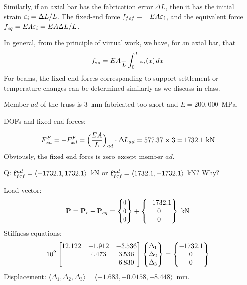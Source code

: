 Similarly, if an axial bar has the fabrication error $\Delta L$, then it has the initial strain $\varepsilon_i = \Delta L/L$. The fixed-end force $f_{fef} = -EA\varepsilon_i$, and the equivalent force $f_{eq} = EA\varepsilon_i = EA\Delta L/L$.

In general, from the principle of virtual work, we have, for an axial bar, that
\begin{equation}
  f_{eq} = EA\frac1L\int_0^L \varepsilon_i(x)\,dx
\end{equation}
For beams, the fixed-end forces corresponding to support settlement or temperature changes can be determined similarly as we discuss in class.
\begin{fig}
  
\end{fig}

\begin{example}
Member $ad$ of the truss is 3~mm fabricated too short and $E = 200{,}000$~MPa.
\begin{fig}
  
\end{fig}
DOFs and fixed end forces:
\begin{fig}
  
\end{fig}
\begin{fig}
  
\end{fig}
\begin{equation*}
  F^F_{xa} = -F^F_{xd} = \Bigl(\frac{EA}{L}\Bigr)_{ad}\cdot\Delta L_{ad} = 577.37\times3 = 1732.1\text{ kN}
\end{equation*}
Obviously, the fixed end force is zero except member $ad$.

Q: $\mathbf{f}^{ad}_{fef} = \langle -1732.1, 1732.1\rangle$~kN or $\mathbf{f}^{ad}_{fef} = \langle 1732.1, -1732.1\rangle$~kN? Why?

Load vector:
\begin{equation*}
  \mathbf{P} = \mathbf{P}_c + \mathbf{P}_{eq} = \begin{Bmatrix}0\\ 0\\ 0\end{Bmatrix} + \begin{Bmatrix}-1732.1\\ 0\\ 0\end{Bmatrix}\text{ kN}
\end{equation*}
Stiffness equations:
\begin{equation*}
  10^2\begin{bmatrix}12.122 & -1.912 & -3.536\\ & 4.473 & 3.536\\ & & 6.830\end{bmatrix}\begin{Bmatrix}\Delta_1\\ \Delta_2\\ \Delta_3\end{Bmatrix} = \begin{Bmatrix}-1732.1\\ 0\\ 0\end{Bmatrix}
\end{equation*}
Displacement: $\langle\Delta_1, \Delta_2, \Delta_3\rangle = \langle -1.683, -0.0158, -8.448\rangle$~mm.
\end{example}

